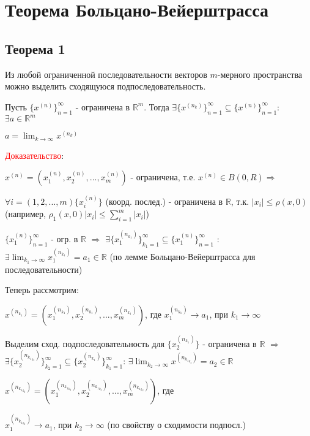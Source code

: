 \section{Теорема Больцано-Вейерштрасса}

\subsection{Теорема 1} Из любой ограниченной последовательности векторов $m$-мерного пространства можно выделить сходящуюся подпоследовательность.

Пусть $\{x^{(n)}\}_{n=1}^{\infty}$ - ограничена в $\mathbb {R}^m$. Тогда $\exists \{x^{(n_k)}\}_{n=1}^{\infty} \subseteq \{x^{(n)}\}_{n=1}^{\infty}$: $\exists a \in \mathbb {R}^m$

$a = \lim_{k\to\infty} x^{(n_k)}$

\textcolor{red}{Доказательство}:

$x^{(n)} = (x^{(n)}_1, x^{(n)}_2, ..., x^{(n)}_m)$ - ограничена, т.е. $ x^{(n)} \in B(0, R) \Rightarrow$ 

$ \forall i=(1, 2,..., m) \{x^{(n)}_i\} $ (коорд. послед.) - ограничена в $\mathbb {R}$, т.к. $ |x_i|\leq \rho(x, 0) $  (например, $ \rho_ 1 (x, 0) |x_i| \leq \sum_{i=1}^{m}|x_i|$)
\vspace{1cm}

$\{x^{(n)}_1\}^{\infty}_{n =1}$ - огр. в $\mathbb {R}$ $\Rightarrow $ $\exists \{x^{(n_{k_1})}_1\}_{k_1=1}^{\infty} \subseteq \{x^{(n)}_1\}_{n=1}^{\infty}$ : $ \exists \lim_{k_1\to\infty} x_1^{(n_{k_1})} = a_1 \in \mathbb {R}$ (по лемме Больцано-Вейерштрасса для последовательности)
\vspace{1cm}

Теперь рассмотрим:

$ x^{(n_{k_1})} = (x^{(n_{k_1})}_1 , x^{(n_{k_1})}_2 , ..., x^{(n_{k_1})}_m)$, где $x^{(n_{k_1})}_1 \rightarrow a_1$, при $k_1 \rightarrow \infty$

Выделим сход. подпоследовательность для $\{x^{(n_{k_1})}_2\}$ - ограничена в $\mathbb {R}$ $\Rightarrow $
$\exists \{x^{(n_{{k_1}_{k_2}})}_2\}_{k_2=1}^{\infty} \subseteq \{x^{(n_{k_1})}_2\}_{k_1=1}^{\infty}$: $ \exists \lim_{k_2\to\infty} x^{(n_{{k_1}_{k_2}})} = a_2 \in \mathbb {R}$
\vspace{1cm}

$ x^{(n_{{k_1}_{k_2}})} = (x^{(n_{{k_1}_{k_2}})}_1, x^{(n_{{k_1}_{k_2}})}_2 , ..., x^{(n_{{k_1}_{k_2}})}_m)$, где

$x^{(n_{{k_1}_{k_2}})}_1 \rightarrow a_1$, при $k_2 \rightarrow \infty$ (по свойству о сходимости подпосл.)

